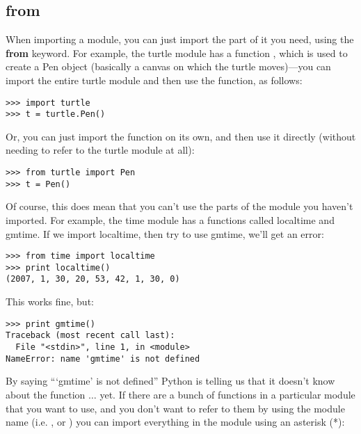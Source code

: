 \subsection*{from}

When importing a module, you can just import the part of it you need, using the \textbf{from} keyword. For example, the turtle module has a function , which is used to create a Pen object (basically a canvas on which the turtle moves)---you can import the entire turtle module and then use the  function, as follows:

\begin{listingignore}
\begin{verbatim}
>>> import turtle
>>> t = turtle.Pen()
\end{verbatim}
\end{listingignore}

Or, you can just import the  function on its own, and then use it directly (without needing to refer to the turtle module at all):

\begin{listingignore}
\begin{verbatim}
>>> from turtle import Pen
>>> t = Pen()
\end{verbatim}
\end{listingignore}

Of course, this does mean that you can't use the parts of the module you haven't imported.  For example, the time module has a functions called localtime and gmtime.  If we import localtime, then try to use gmtime, we'll get an error:

\begin{listingignore}
\begin{verbatim}
>>> from time import localtime
>>> print localtime()
(2007, 1, 30, 20, 53, 42, 1, 30, 0)
\end{verbatim}
\end{listingignore}

\noindent
This works fine, but:

\begin{listing}
\begin{verbatim}
>>> print gmtime()
Traceback (most recent call last):
  File "<stdin>", line 1, in <module>
NameError: name 'gmtime' is not defined
\end{verbatim}
\end{listing}

By saying ```gmtime' is not defined'' Python is telling us that it doesn't know about the function $\ldots$ yet. If there are a bunch of functions in a particular module that you want to use, and you don't want to refer to them by using the module name (i.e. , or ) you can import everything in the module using an asterisk (*):


